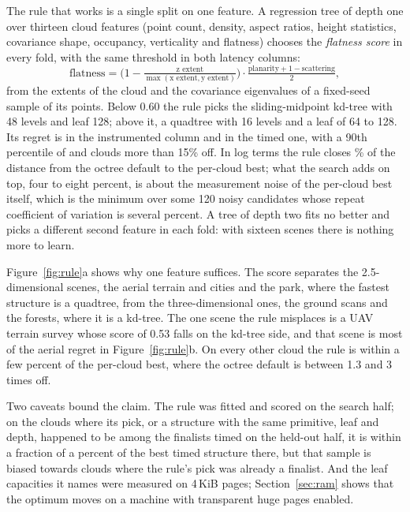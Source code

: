 The rule that works is a single split on one feature. A regression tree of depth one over thirteen cloud features (point count, density, aspect ratios, height statistics, covariance shape, occupancy, verticality and flatness) chooses the \emph{flatness score} in every fold, with the same threshold in both latency columns:
\[
\text{flatness} = \bigl(1 - \tfrac{\text{z extent}}{\max(\text{x extent}, \text{y extent})}\bigr)\cdot\tfrac{\text{planarity} + 1 - \text{scattering}}{2},
\]
from the extents of the cloud and the covariance eigenvalues of a fixed-seed sample of its points. Below 0.60 the rule picks the sliding-midpoint kd-tree with 48 levels and leaf 128; above it, a quadtree with 16 levels and a leaf of 64 to 128. Its regret is  in the instrumented column and  in the timed one, with a 90th percentile of  and  clouds more than 15\% off. In log terms the rule closes \% of the distance from the octree default to the per-cloud best; what the search adds on top, four to eight percent, is about the measurement noise of the per-cloud best itself, which is the minimum over some 120 noisy candidates whose repeat coefficient of variation is several percent. A tree of depth two fits no better and picks a different second feature in each fold: with sixteen scenes there is nothing more to learn.

Figure~\ref{fig:rule}a shows why one feature suffices. The score separates the 2.5-dimensional scenes, the aerial terrain and cities and the park, where the fastest structure is a quadtree, from the three-dimensional ones, the ground scans and the forests, where it is a kd-tree. The one scene the rule misplaces is a UAV terrain survey whose score of 0.53 falls on the kd-tree side, and that scene is most of the aerial regret in Figure~\ref{fig:rule}b. On every other cloud the rule is within a few percent of the per-cloud best, where the octree default is between 1.3 and 3 times off.

Two caveats bound the claim. The rule was fitted and scored on the search half; on the clouds where its pick, or a structure with the same primitive, leaf and depth, happened to be among the finalists timed on the held-out half, it is within a fraction of a percent of the best timed structure there, but that sample is biased towards clouds where the rule's pick was already a finalist. And the leaf capacities it names were measured on 4\,KiB pages; Section~\ref{sec:ram} shows that the optimum moves on a machine with transparent huge pages enabled.
